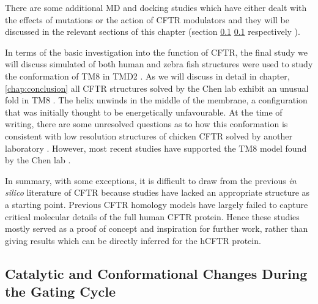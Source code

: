 There are some additional MD and docking studies which have either dealt with the effects of mutations or the action of CFTR modulators and they will be discussed in the relevant sections of this chapter (section \ref{} \ref{} respectively )\cite{billet2020, sabusap2021}.

In terms of the basic investigation into the function of CFTR, the final study we will discuss simulated of both human and zebra fish structures were used to study the conformation of TM8 in TMD2 \cite{corradi2018}. As we will discuss in detail in chapter, \ref{chap:conclusion} all CFTR structures solved by the Chen lab exhibit an unusual fold in TM8 \cite{fiedorczuk2021, liu2017, liu2019, zhang2016, zhang2018a, zhang2017a}. The helix unwinds in the middle of the membrane, a configuration that was initially thought to be energetically unfavourable. At the time of writing, there are some unresolved questions as to how this conformation is consistent with low resolution structures of chicken CFTR solved by another laboratory \cite{fay2018}. However, most recent studies have supported the TM8 model found by the Chen lab \cite{corradi2018, negoda2019}. 

In summary, with some exceptions, it is difficult to draw from the previous \textit{in silico} literature of CFTR because studies have lacked an appropriate structure as a starting point. Previous CFTR homology models have largely failed to capture critical molecular details of the full human CFTR protein. Hence these studies mostly served as a proof of concept and inspiration for further work, rather than giving results which can be directly inferred for the hCFTR protein. 



\subsection{Catalytic and Conformational Changes During the Gating Cycle}

